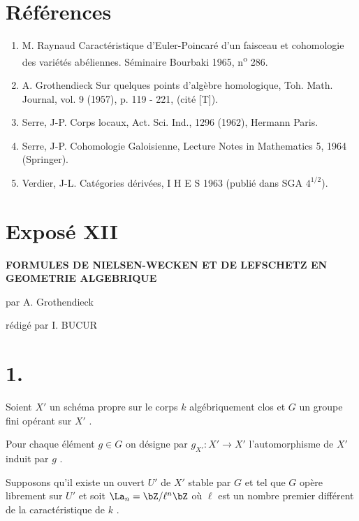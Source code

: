 \section*{Références}

\begin{enumerate}
\item[{[1]}] M.
Raynaud Caractéristique d'Euler-Poincaré d'un faisceau et cohomologie des variétés abéliennes. Séminaire Bourbaki 1965, n\textsuperscript{o} 286.
\item[{[2]}] A. Grothendieck Sur quelques points d'algèbre homologique, Toh. Math. Journal, vol. 9 (1957), p. 119 - 221, (cité [T]).
\item[{[3]}] Serre, J-P. Corps locaux, Act. Sci. Ind., 1296 (1962), Hermann Paris.
\item[{[4]}] Serre, J-P. Cohomologie Galoisienne, Lecture Notes in Mathematics 5, 1964 (Springer).
\item[{[5]}] Verdier, J-L. Catégories dérivées, I H E S 1963 (publié dans SGA $4^{1/2}$).
\end{enumerate}

\renewcommand{\EP}{\operatorname{EP}}
\renewcommand{\Ob}{\operatorname{ob}}
\section*{Exposé XII}

\begin{center}
\Large\bf
FORMULES DE NIELSEN-WECKEN ET DE LEFSCHETZ EN GEOMETRIE ALGEBRIQUE
\end{center}

\begin{center}
par A. Grothendieck

rédigé par I. BUCUR
\end{center}

\bigskip

\section*{1.}
Soient $X'$ un schéma propre sur le corps $k$ algébriquement clos et $G$ un groupe fini opérant sur $X'$ .

Pour chaque élément $g \in G$ on désigne par $g_{X'} : X' \to X'$ l'automorphisme de $X'$ induit par $g$ .

Supposons qu'il existe un ouvert $U'$ de $X'$ stable par $G$ et tel que $G$ opère librement sur $U'$ et soit $\La_n = \bZ/\ell^n\bZ$ où $\ell$ est un nombre premier différent de la caractéristique de $k$ .

